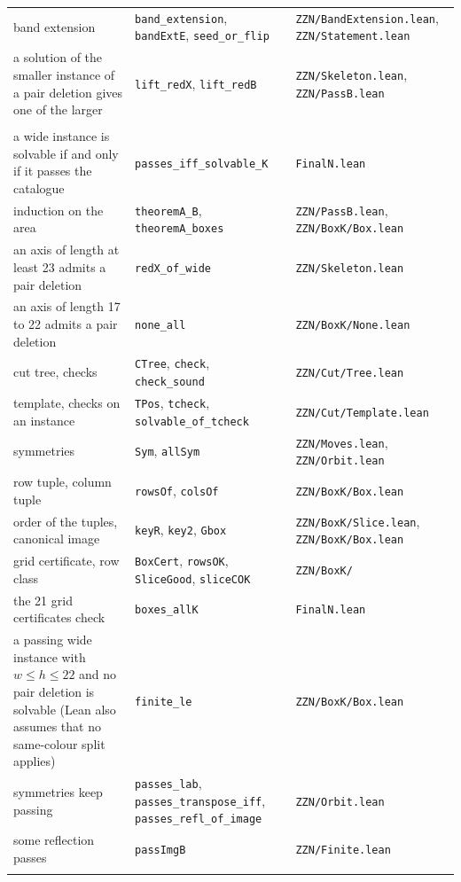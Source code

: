 \documentclass[11pt]{article}
\newcommand{\lean}[1]{\texttt{#1}}
\newcommand{\lf}[1]{\nolinkurl{#1}}
\begin{document}
{\begin{longtable}{@{}>{\raggedright\arraybackslash}p{}>{\raggedright\arraybackslash}p{}>{\raggedright\arraybackslash}p{}@{}}
band extension & \lean{band\_extension}, \lean{bandExtE}, \lean{seed\_or\_flip} & \lf{ZZN/BandExtension.lean}, \lf{ZZN/Statement.lean} \\
a solution of the smaller instance of a pair deletion gives one of the larger & \lean{lift\_redX}, \lean{lift\_redB} & \lf{ZZN/Skeleton.lean}, \lf{ZZN/PassB.lean} \\
\multicolumn{3}{@{}l}{\emph{Sufficiency (Section 3.4)}} \\
a wide instance is solvable if and only if it passes the catalogue & \lean{passes\_iff\_solvable\_K} & \lf{FinalN.lean} \\
induction on the area & \lean{theoremA\_B}, \lean{theoremA\_boxes} & \lf{ZZN/PassB.lean}, \lf{ZZN/BoxK/Box.lean} \\
an axis of length at least 23 admits a pair deletion & \lean{redX\_of\_wide} & \lf{ZZN/Skeleton.lean} \\
an axis of length 17 to 22 admits a pair deletion & \lean{none\_all} & \lf{ZZN/BoxK/None.lean} \\
cut tree, checks & \lean{CTree}, \lean{check}, \lean{check\_sound} & \lf{ZZN/Cut/Tree.lean} \\
template, checks on an instance & \lean{TPos}, \lean{tcheck}, \lean{solvable\_of\_tcheck} & \lf{ZZN/Cut/Template.lean} \\
symmetries & \lean{Sym}, \lean{allSym} & \lf{ZZN/Moves.lean}, \lf{ZZN/Orbit.lean} \\
row tuple, column tuple & \lean{rowsOf}, \lean{colsOf} & \lf{ZZN/BoxK/Box.lean} \\
order of the tuples, canonical image & \lean{keyR}, \lean{key2}, \lean{Gbox} & \lf{ZZN/BoxK/Slice.lean}, \lf{ZZN/BoxK/Box.lean} \\
grid certificate, row class & \lean{BoxCert}, \lean{rowsOK}, \lean{SliceGood}, \lean{sliceCOK} & \lf{ZZN/BoxK/} \\
the 21 grid certificates check & \lean{boxes\_allK} & \lf{FinalN.lean} \\
a passing wide instance with $w\le h\le 22$ and no pair deletion is solvable (Lean also assumes that no same-colour split applies) & \lean{finite\_le} & \lf{ZZN/BoxK/Box.lean} \\
symmetries keep passing & \lean{passes\_lab}, \lean{passes\_transpose\_iff}, \lean{passes\_refl\_of\_image} & \lf{ZZN/Orbit.lean} \\
some reflection passes & \lean{passImgB} & \lf{ZZN/Finite.lean} \\
\multicolumn{3}{@{}l}{\emph{Algorithm (Section 3.5)}} \\

\end{longtable}}
\end{document}
